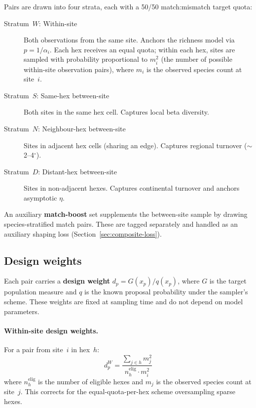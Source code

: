 \documentclass{article}
\begin{document}
Pairs are drawn into four strata, each with a 50/50 match:mismatch target quota:

\begin{description}
    \item[Stratum~$W$: Within-site] Both observations from the same site. Anchors the richness model via $p = 1/\alpha_i$. Each hex receives an equal quota; within each hex, sites are sampled with probability proportional to $m_i^2$ (the number of possible within-site observation pairs), where $m_i$ is the observed species count at site~$i$.
    
    \item[Stratum~$S$: Same-hex between-site] Both sites in the same hex cell. Captures local beta diversity.
    
    \item[Stratum~$N$: Neighbour-hex between-site] Sites in adjacent hex cells (sharing an edge). Captures regional turnover ($\sim$2--4$^\circ$).
    
    \item[Stratum~$D$: Distant-hex between-site] Sites in non-adjacent hexes. Captures continental turnover and anchors asymptotic $\eta$.
\end{description}

An auxiliary \textbf{match-boost} set supplements the between-site sample by drawing species-stratified match pairs. These are tagged separately and handled as an auxiliary shaping loss (Section~\ref{sec:composite-loss}).

\subsection{Design weights}

Each pair carries a \textbf{design weight} $d_p = G(x_p) / q(x_p)$, where $G$ is the target population measure and $q$ is the known proposal probability under the sampler's scheme. These weights are fixed at sampling time and do not depend on model parameters.

\paragraph{Within-site design weights.} For a pair from site~$i$ in hex~$h$:
\begin{equation}
    d_p^W = \frac{\sum_{j \in h} m_j^2}{n_h^{\text{elig}} \cdot m_i^2}
\end{equation}
where $n_h^{\text{elig}}$ is the number of eligible hexes and $m_j$ is the observed species count at site~$j$. This corrects for the equal-quota-per-hex scheme oversampling sparse hexes.
\end{document}
